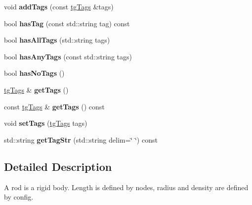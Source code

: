 \begin{DoxyCompactItemize}
\item 
\hypertarget{classtg_taggable_af28e3fe1a7e4eb28772dc006d575dd1f}{void {\bfseries add\-Tags} (const \hyperlink{classtg_tags}{tg\-Tags} \&tags)}\label{classtg_taggable_af28e3fe1a7e4eb28772dc006d575dd1f}

\item 
\hypertarget{classtg_taggable_ae31f65869c8887bfeb34a344902c4d5b}{bool {\bfseries has\-Tag} (const std\-::string tag) const }\label{classtg_taggable_ae31f65869c8887bfeb34a344902c4d5b}

\item 
\hypertarget{classtg_taggable_a33b77b1075171b63f673965687b2e844}{bool {\bfseries has\-All\-Tags} (std\-::string tags)}\label{classtg_taggable_a33b77b1075171b63f673965687b2e844}

\item 
\hypertarget{classtg_taggable_af14af28fa98021c4f20a5e8f2ddd5606}{bool {\bfseries has\-Any\-Tags} (const std\-::string tags)}\label{classtg_taggable_af14af28fa98021c4f20a5e8f2ddd5606}

\item 
\hypertarget{classtg_taggable_adff345e116e16420c701a748ff8f995f}{bool {\bfseries has\-No\-Tags} ()}\label{classtg_taggable_adff345e116e16420c701a748ff8f995f}

\item 
\hypertarget{classtg_taggable_acf1d7fa9df8f374f25015c4080902681}{\hyperlink{classtg_tags}{tg\-Tags} \& {\bfseries get\-Tags} ()}\label{classtg_taggable_acf1d7fa9df8f374f25015c4080902681}

\item 
\hypertarget{classtg_taggable_ae70d7d3b45301665bc363b0ed8b9b292}{const \hyperlink{classtg_tags}{tg\-Tags} \& {\bfseries get\-Tags} () const }\label{classtg_taggable_ae70d7d3b45301665bc363b0ed8b9b292}

\item 
\hypertarget{classtg_taggable_a5492888e4e4da4cca6261070b5726adf}{void {\bfseries set\-Tags} (\hyperlink{classtg_tags}{tg\-Tags} tags)}\label{classtg_taggable_a5492888e4e4da4cca6261070b5726adf}

\item 
\hypertarget{classtg_taggable_a346d66b066d2d9eb1eadba01da43749f}{std\-::string {\bfseries get\-Tag\-Str} (std\-::string delim=\char`\"{} \char`\"{}) const }\label{classtg_taggable_a346d66b066d2d9eb1eadba01da43749f}

\end{DoxyCompactItemize}


\subsection{Detailed Description}
A rod is a rigid body. Length is defined by nodes, radius and density are defined by config. 

